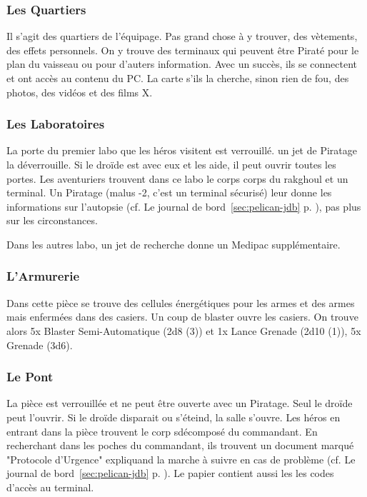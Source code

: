 \subsubsection{Les Quartiers}
Il s’agit des quartiers de l’équipage. Pas grand chose à y trouver, des vètements, des effets personnels. On y trouve des terminaux qui peuvent être Piraté pour le plan du vaisseau ou pour d’auters information. Avec un succès, ils se connectent et ont accès au contenu du PC. La carte s’ils la cherche, sinon rien de fou, des photos, des vidéos et des films X.

\subsubsection{Les Laboratoires}
La porte du premier labo que les héros visitent est verrouillé. un jet de Piratage la déverrouille. Si le droïde est avec eux et les aide, il peut ouvrir toutes les portes. Les aventuriers trouvent dans ce labo le corps corps du rakghoul et un terminal. Un Piratage (malus -2, c’est un terminal sécurisé) leur donne les informations sur l’autopsie (cf. Le journal de bord~\ref{sec:pelican-jdb} p. \pageref{sec:pelican-jdb}), pas plus sur les circonstances.

Dans les autres labo, un jet de recherche donne un Medipac supplémentaire.

\subsubsection{L’Armurerie}
Dans cette pièce se trouve des cellules énergétiques pour les armes et des armes mais enfermées dans des casiers. Un coup de blaster ouvre les casiers. On trouve alors 5x Blaster Semi-Automatique (2d8 (3)) et 1x Lance Grenade (2d10 (1)), 5x Grenade (3d6).


\subsubsection{Le Pont}
La pièce est verrouillée et ne peut être ouverte avec un Piratage. Seul le droïde peut l’ouvrir. Si le droïde disparait ou s’éteind, la salle s’ouvre. Les héros en entrant dans la pièce trouvent le corp sdécomposé du commandant. En recherchant dans les poches du commandant, ils trouvent un document marqué "Protocole d’Urgence" expliquand la marche à suivre en cas de problème (cf. Le journal de bord~\ref{sec:pelican-jdb} p. \pageref{sec:pelican-jdb}). Le papier contient aussi les les codes d’accès au terminal.

